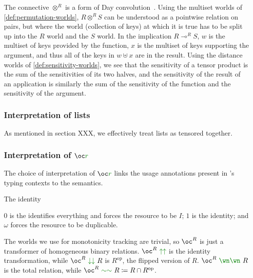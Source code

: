 The connective $\otimes^R$ is a form of Day convolution~\citep{Day70}.
Using the multiset worlds of \cref{def:permutation-worlds}, $R \otimes^R S$ can
be understood as a pointwise relation on pairs, but where the world (collection
of keys) at which it is true has to be split up into the $R$ world and the $S$
world.
In the implication $R \multimap^R S$, $w$ is the multiset of keys provided by
the function, $x$ is the multiset of keys supporting the argument, and thus all
of the keys in $w \uplus x$ are in the result.
Using the distance worlds of \cref{def:sensitivity-worlds}, we see that the
sensitivity of a tensor product is the sum of the sensitivities of its two
halves, and the sensitivity of the result of an application is similarly the sum
of the sensitivity of the function and the sensitivity of the argument.


\subsubsection{Interpretation of lists}

As mentioned in section XXX, we effectively treat lists as tensored
together. 

\subsubsection{Interpretation of $\oc\gr r$}

The choice of interpretation of $\oc\gr r$ links the usage
annotations present in \name{}'s typing contexts to the semantics.

\begin{example}[Trivial]
  The identity
\end{example}

\begin{example}
  $0$ is the identifies everything and forces the resource to be $I$;
  $1$ is the identity; and $\omega$ forces the resource to be
  duplicable.
\end{example}

\begin{example}
  The worlds we use for monotonicity tracking are trivial, so $\oc^R$ is just
  a transformer of homogeneous binary relations.
  $\oc^R~\gr{\uparrow\uparrow}$ is the identity transformation, while
  $\oc^R~\gr{\downarrow\downarrow}~R$ is $R^{\mathrm{op}}$, the flipped version of
  $R$.
  $\oc^R~\gr{\wn\wn}~R$ is the total relation, while
  $\oc^R~\gr{\sim\sim}~R \coloneqq R \cap R^{\mathrm{op}}$.
\end{example}

